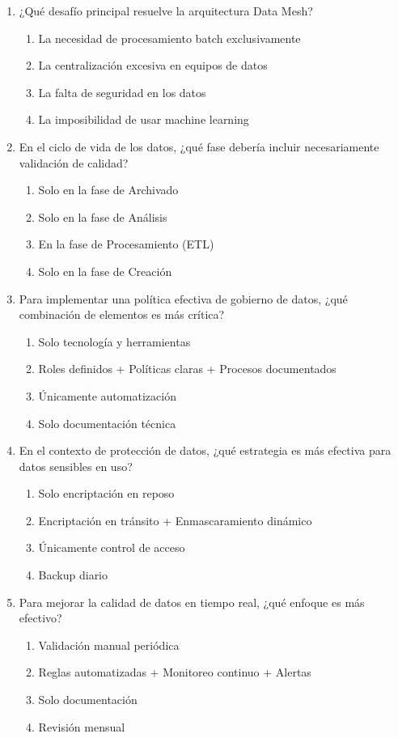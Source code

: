 \documentclass[12pt]{article}
\begin{document}
\begin{enumerate}[label=\arabic*.]
\item ¿Qué desafío principal resuelve la arquitectura Data Mesh?
\begin{enumerate}
    \item La necesidad de procesamiento batch exclusivamente
    \item La centralización excesiva en equipos de datos
    \item La falta de seguridad en los datos
    \item La imposibilidad de usar machine learning
\end{enumerate}

\item En el ciclo de vida de los datos, ¿qué fase debería incluir necesariamente validación de calidad?
\begin{enumerate}
    \item Solo en la fase de Archivado
    \item Solo en la fase de Análisis
    \item En la fase de Procesamiento (ETL)
    \item Solo en la fase de Creación
\end{enumerate}

\item Para implementar una política efectiva de gobierno de datos, ¿qué combinación de elementos es más crítica?
\begin{enumerate}
    \item Solo tecnología y herramientas
    \item Roles definidos + Políticas claras + Procesos documentados
    \item Únicamente automatización
    \item Solo documentación técnica
\end{enumerate}

\item En el contexto de protección de datos, ¿qué estrategia es más efectiva para datos sensibles en uso?
\begin{enumerate}
    \item Solo encriptación en reposo
    \item Encriptación en tránsito + Enmascaramiento dinámico
    \item Únicamente control de acceso
    \item Backup diario
\end{enumerate}

\item Para mejorar la calidad de datos en tiempo real, ¿qué enfoque es más efectivo?
\begin{enumerate}
    \item Validación manual periódica
    \item Reglas automatizadas + Monitoreo continuo + Alertas
    \item Solo documentación
    \item Revisión mensual
\end{enumerate}


\end{enumerate}
\end{document}
